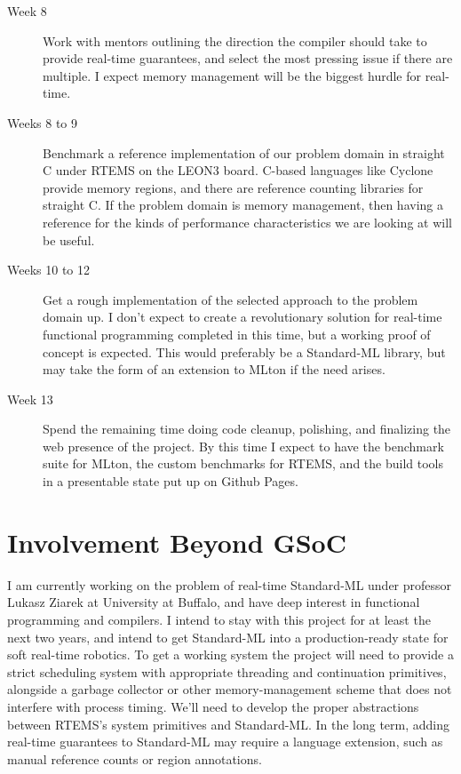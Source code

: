 \documentclass[12pt]{article}
\begin{document}
\begin{description}
\item[Week 8] Work with mentors outlining the direction the compiler should take to provide real-time guarantees, and select the most pressing issue if there are multiple. I expect memory management will be the biggest hurdle for real-time.
\item[Weeks 8 to 9] Benchmark a reference implementation of our problem domain in straight C under RTEMS on the LEON3 board. C-based languages like Cyclone provide memory regions, and there are reference counting libraries for straight C. If the problem domain is memory management, then having a reference for the kinds of performance characteristics we are looking at will be useful.
\item[Weeks 10 to 12] Get a rough implementation of the selected approach to the problem domain up. I don't expect to create a revolutionary solution for real-time functional programming completed in this time, but a working proof of concept is expected. This would preferably be a Standard-ML library, but may take the form of an extension to MLton if the need arises.
\item[Week 13] Spend the remaining time doing code cleanup, polishing, and finalizing the web presence of the project. By this time I expect to have the benchmark suite for MLton, the custom benchmarks for RTEMS, and the build tools in a presentable state put up on Github Pages.

\end{description}

\section{Involvement Beyond GSoC}
I am currently working on the problem of real-time Standard-ML under professor Lukasz Ziarek at University at Buffalo, and have deep interest in functional programming and compilers. I intend to stay with this project for at least the next two years, and intend to get Standard-ML into a production-ready state for soft real-time robotics. To get a working system the project will need to provide a strict scheduling system with appropriate threading and continuation primitives, alongside a garbage collector or other memory-management scheme that does not interfere with process timing. We'll need to develop the proper abstractions between RTEMS's system primitives and Standard-ML. In the long term, adding real-time guarantees to Standard-ML may require a language extension, such as manual reference counts or region annotations.
\end{document}
